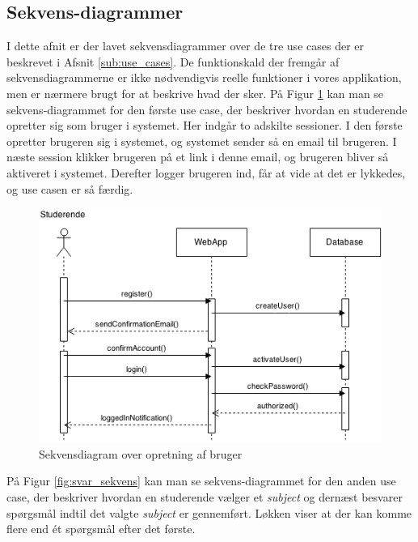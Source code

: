 \documentclass[11pt, a4paper]{article}
\begin{document}
\subsection{Sekvens-diagrammer}
I dette afnit er der lavet sekvensdiagrammer over de tre use cases der er beskrevet i Afsnit \ref{sub:use_cases}. De funktionskald der fremgår af sekvensdiagrammerne er ikke nødvendigvis reelle funktioner i vores applikation, men er nærmere brugt for at beskrive hvad der sker.
På Figur \ref{fig:opret_bruger_sekvens} kan man se sekvens-diagrammet for den første use case, der beskriver hvordan en studerende opretter sig som bruger i systemet. Her indgår to adskilte sessioner. I den første opretter brugeren sig i systemet, og systemet sender så en email til brugeren. I næste session klikker brugeren på et link i denne email, og brugeren bliver så aktiveret i systemet. Derefter logger brugeren ind, får at vide at det er lykkedes, og use casen er så færdig.

\begin{figure}[h]
    \centering
    \includegraphics[width=1\linewidth]{figures/OpretBrugerUseCase.png}
    \caption{Sekvensdiagram over opretning af bruger}
    \label{fig:opret_bruger_sekvens}
\end{figure}

På Figur \ref{fig:svar_sekvens} kan man se sekvens-diagrammet for den anden use case, der beskriver hvordan en studerende vælger et \emph{subject} og dernæst besvarer spørgsmål indtil det valgte \emph{subject} er gennemført. Løkken viser at der kan komme flere end ét spørgsmål efter det første.
\end{document}
